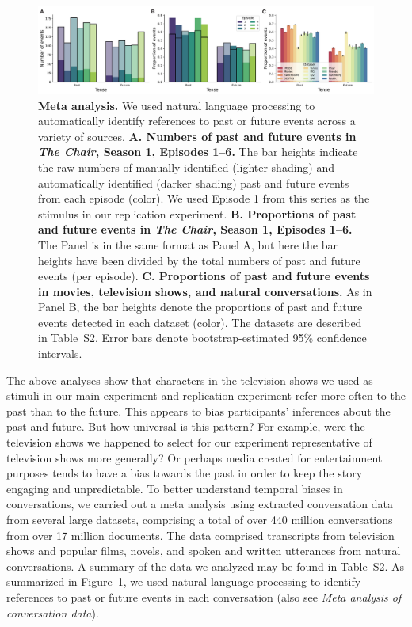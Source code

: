 \documentclass[10pt]{article}
\newcommand{\metaTable}{S2}
\begin{document}
\begin{figure}[tp]
  \centering
  \includegraphics[width=\textwidth]{meta-analysis}

\caption{\textbf{Meta analysis.} We used natural language processing to
automatically identify references to past or future events across a variety of
sources. \textbf{A. Numbers of past and future events in \textit{The Chair},
Season 1, Episodes 1--6.} The bar heights indicate the raw numbers of manually
identified (lighter shading) and automatically identified (darker shading) past
and future events from each episode (color). We used Episode 1 from this series
as the stimulus in our replication experiment. \textbf{B. Proportions of past
and future events in \textit{The Chair}, Season 1, Episodes 1--6.} The Panel is
in the same format as Panel A, but here the bar heights have been divided by
the total numbers of past and future events (per episode). \textbf{C.
Proportions of past and future events in movies, television shows, and natural
conversations.} As in Panel B, the bar heights denote the proportions of past
and future events detected in each dataset (color). The datasets are described
in Table~\metaTable. Error bars denote bootstrap-estimated 95\% confidence
intervals.}
  
  \label{fig:meta-analysis}
\end{figure}

The above analyses show that characters in the television shows we used as
stimuli in our main experiment and replication experiment refer more often to
the past than to the future. This appears to bias participants' inferences
about the past and future. But how universal is this pattern? For example, were
the television shows we happened to select for our experiment representative of
television shows more generally? Or perhaps media created for entertainment
purposes tends to have a bias towards the past in order to keep the story
engaging and unpredictable. To better understand temporal biases in
conversations, we carried out a meta analysis using extracted conversation data
from several large datasets, comprising a total of over 440 million
conversations from over 17 million documents. The data comprised transcripts
from television shows and popular films, novels, and spoken and written
utterances from natural conversations. A summary of the data we analyzed may be
found in Table~\metaTable. As summarized in Figure~\ref{fig:meta-analysis}, we
used natural language processing to identify references to past or future
events in each conversation (also see \textit{Meta analysis of conversation
data}).
\end{document}
